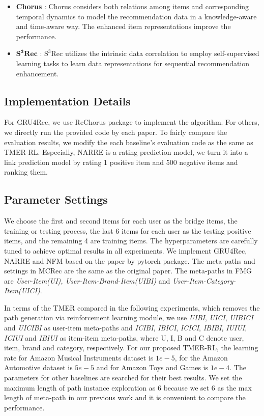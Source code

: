 \begin{itemize}
	\item \textbf{Chorus} \cite{wang2020make}: Chorus considers both relations among items and corresponding temporal dynamics to model the recommendation data in a knowledge-aware and time-aware way. The enhanced item representations improve the performance.

	\item $\mathbf{S^3Rec}$ \cite{zhou2020s3}: $\mathrm{S^3Rec}$ utilizes the intrinsic data correlation to employ self-supervised learning tasks to learn data representations for sequential recommendation enhancement.
	

		
\end{itemize}

\subsection{Implementation Details}
\label{subsec:imple_details}
For GRU4Rec, we use ReChorus package \cite{wang2020make} to implement the algorithm. For others, we directly run the provided code by each paper. To fairly compare the evaluation results, we modify the each baseline's evaluation code as the same as TMER-RL. Especially, NARRE is a rating prediction model, we turn it into a link prediction model by rating 1 positive item and 500 negative items and ranking them. 

\subsection{Parameter Settings}
\label{subsec:param_settings}
We choose the first and second items for each user as the bridge items, the training or testing process, the last 6 items for each user as the testing positive items, and the remaining 4 are training items. 
The hyperparameters are carefully tuned to achieve optimal results in all experiments. We implement GRU4Rec, NARRE and NFM based on the paper by pytorch package. The meta-paths and settings in MCRec are the same as the original paper. The meta-paths in FMG are \textit{User-Item(UI), User-Item-Brand-Item(UIBI)} and \textit{User-Item-Category-Item(UICI)}.

In terms of the TMER compared in the following experiments, which removes the path generation via reinforcement learning module, we use \textit{UIBI}, \textit{UICI}, \textit{UIBICI} and \textit{UICIBI} as user-item meta-paths and \textit{ICIBI}, \textit{IBICI}, \textit{ICICI}, \textit{IBIBI}, \textit{IUIUI}, \textit{ICIUI} and \textit{IBIUI} as item-item meta-paths, where U, I, B and C denote user, item, brand and category, respectively. 
For our proposed TMER-RL, the learning rate for Amazon Musical Instruments dataset is $1e-5$, for the Amazon Automotive dataset is $5e-5$ and for Amazon Toys and Games is $1e-4$. The parameters for other baselines are searched for their best results. We set the maximum length of path instance exploration as 6 because we set 6 as the max length of meta-path in our previous work \cite{10.1145/3437963.3441762} and it is convenient to compare the performance. 


